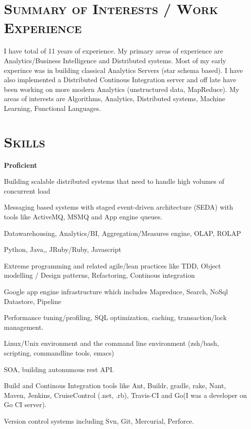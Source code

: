 \begin{resume}




\section{\textsc{Summary of Interests / Work Experience}}
I have total of 11 years of experience. My primary areas of experience are Analytics/Business Intelligence and Distributed systems. Most of my early experince was in building classical Analytics Servers (star schema based). I have also implemented a Distributed Continous Integration server and off late have been working on more modern Analytics (unstructured data, MapReduce). My areas of interests are Algorithms, Analytics, Distributed systems, Machine Learning, Functional Languages.

\section{\textsc{Skills}} 
{\textbf{Proficient}}
\begin{mylist}
  \item Building scalable distributed systems that need to handle high volumes of concurrent load
  \item Messaging based systems with staged event-driven architecture (SEDA) with tools like ActiveMQ, MSMQ and App engine queues.
  \item Datawarehousing, Analytics/BI, Aggregation/Measures engine, OLAP, ROLAP
  \item Python, Java,\CSharp, JRuby/Ruby, Javascript
  \item Extreme programming and related agile/lean practices like TDD, Object modelling / Design patterns, Refactoring, Continous integration
  \item Google app engine infrastructure which includes Mapreduce, Search, NoSql Datastore, Pipeline
  \item Performance tuning/profiling, SQL optimization, caching, transaction/lock management.
  \item Linux/Unix environment and the command line environment (zsh/bash, scripting, commandline tools, emacs)
 \item SOA, building autonumous rest API.

  \item Build and Continous Integration tools like Ant, Buildr, gradle, rake, Nant, Maven,  Jenkins, CruiseControl (.net, .rb), Travis-CI and Go(I was a developer on Go CI server).
\item Version control systems including Svn, Git, Mercurial, Perforce.
\end{mylist}


\end{resume}
